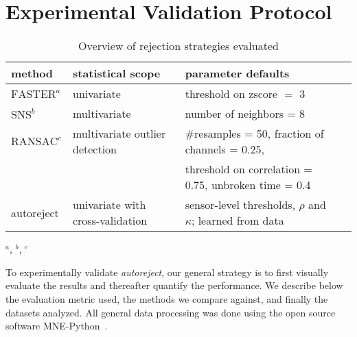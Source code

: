 \section{Experimental Validation Protocol}

\begin{table}[!b]
{
    \caption{Overview of rejection strategies evaluated\label{tab:strategies}}
       \begin{center}
       \begin{tabular}{l l l l}
        \hline
        \textbf{method} & \textbf{statistical scope} & \textbf{parameter defaults}\\
        \hline
        $\text{FASTER}^{a}$ & univariate & threshold on zscore $=$ 3 \\
        $\text{SNS}^{b}$ & multivariate & number of neighbors = 8\\
        $\text{RANSAC}^{c}$ & multivariate outlier detection & \#resamples = 50, fraction of channels = 0.25,\\
        & & threshold on correlation = 0.75, unbroken time = 0.4 \\
        autoreject & univariate with cross-validation & sensor-level thresholds, $\rho$ and $\kappa$; learned from data \\
        \hline
        \end{tabular}
        \label{table:methods}
        \end{center}
        \vspace{-0.9em}
        \hspace{1em}
        {\footnotesize
         $^a$\cite{nolan2010faster}, $^b$\cite{de2008sensor},  $^c$\cite{bigdely2015prep}}
}
\end{table}

To experimentally validate \emph{autoreject}, our general strategy is to first visually evaluate the results and thereafter quantify the performance. We describe below the evaluation metric used, the methods we compare against, and finally the datasets analyzed. All general data processing was done using the open source software MNE-Python~\citep{gramfort2013meg}.

